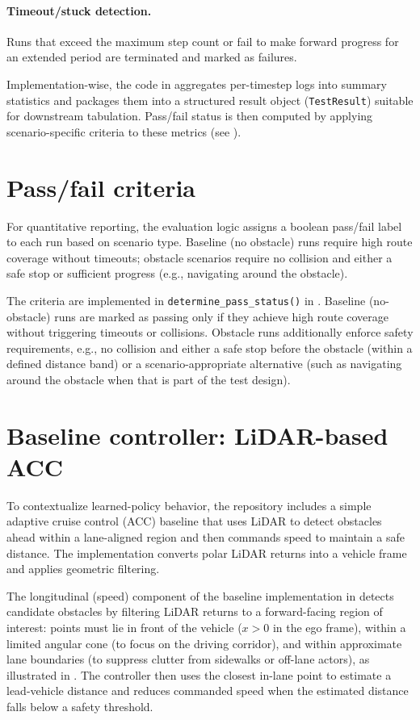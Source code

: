 \paragraph{Timeout/stuck detection.}
Runs that exceed the maximum step count or fail to make forward progress for an extended period are terminated and marked as failures.

\medskip\noindent
Implementation-wise, the code in  aggregates per-timestep logs into summary statistics and packages them into a structured result object (\texttt{TestResult}) suitable for downstream tabulation. Pass/fail status is then computed by applying scenario-specific criteria to these metrics (see ).

\section{Pass/fail criteria}
\label{sec:pass-fail}
For quantitative reporting, the evaluation logic assigns a boolean pass/fail label to each run based on scenario type. Baseline (no obstacle) runs require high route coverage without timeouts; obstacle scenarios require no collision and either a safe stop or sufficient progress (e.g., navigating around the obstacle).

The criteria are implemented in \texttt{determine\_pass\_status()} in . Baseline (no-obstacle) runs are marked as passing only if they achieve high route coverage without triggering timeouts or collisions. Obstacle runs additionally enforce safety requirements, e.g., no collision and either a safe stop before the obstacle (within a defined distance band) or a scenario-appropriate alternative (such as navigating around the obstacle when that is part of the test design).

\section{Baseline controller: LiDAR-based ACC}
\label{sec:acc-baseline}
To contextualize learned-policy behavior, the repository includes a simple adaptive cruise control (ACC) baseline that uses LiDAR to detect obstacles ahead within a lane-aligned region and then commands speed to maintain a safe distance. The implementation converts polar LiDAR returns into a vehicle frame and applies geometric filtering.

The longitudinal (speed) component of the baseline implementation in  detects candidate obstacles by filtering LiDAR returns to a forward-facing region of interest: points must lie in front of the vehicle ($x>0$ in the ego frame), within a limited angular cone (to focus on the driving corridor), and within approximate lane boundaries (to suppress clutter from sidewalks or off-lane actors), as illustrated in . The controller then uses the closest in-lane point to estimate a lead-vehicle distance and reduces commanded speed when the estimated distance falls below a safety threshold.

